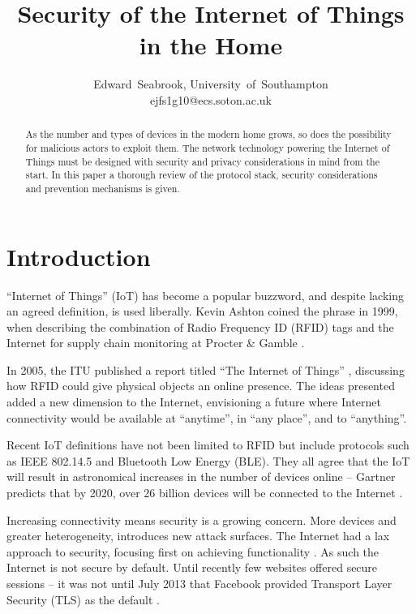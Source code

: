 \documentclass[10pt,journal,compsoc]{IEEEtran}
\begin{document}
\title{Security of the Internet of Things in the Home}
\author{Edward~Seabrook, University~of~Southampton \\ ejfs1g10@ecs.soton.ac.uk}

\maketitle

\begin{abstract}
As the number and types of devices in the modern home grows, so does the
possibility for malicious actors to exploit them. The network technology
powering the Internet of Things must be designed with security and privacy
considerations in mind from the start. In this paper a thorough review of the
protocol stack, security considerations and prevention mechanisms is given. 
\end{abstract}

\IEEEpeerreviewmaketitle

\section{Introduction}
 ``Internet of Things'' (IoT) has become a popular
buzzword, and despite lacking an agreed definition, is used liberally. Kevin
Ashton coined the phrase in 1999, when describing the combination of Radio
Frequency ID (RFID) tags and the Internet for supply chain monitoring at
Procter \& Gamble \cite{Ashton2009}. 

In 2005, the ITU published a report titled ``The Internet of Things''
\cite{ITU_IoT}, discussing how RFID could give physical objects an online
presence. The ideas presented added a new dimension to the Internet,
envisioning a future where Internet connectivity would be available at
``anytime'', in ``any place'', and to ``anything''.

Recent IoT definitions have not been limited to RFID but include protocols such
as IEEE 802.14.5 and Bluetooth Low Energy (BLE). They all agree that the IoT
will result in astronomical increases in the number of devices online --
Gartner predicts that by 2020, over 26 billion devices will be connected to the
Internet \cite{Gartner2014}. 

Increasing connectivity means security is a growing concern. More devices and
greater heterogeneity, introduces new attack surfaces. The Internet had a lax
approach to security, focusing first on achieving functionality
\cite{Bhimani1996}. As such the Internet is not secure by default.
Until recently few websites offered secure sessions -- it was not until July
2013 that Facebook provided Transport Layer Security (TLS) as the default
\cite{Facebook2013}. 
\end{document}
